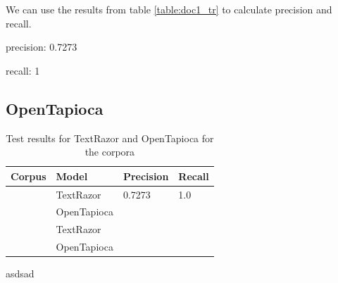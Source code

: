 \documentclass[a4paper, 11pt]{article}
\begin{document}
We can use the results from table \ref{table:doc1_tr} to calculate precision and recall.

precision: 0.7273

recall: 1


\subsection{OpenTapioca}

\begin{table}[h]
	\centering
	\begin{tabular}{llll}
	Corpus	& Model & Precision & Recall \\ \hline
	\citet{mcgee_2020}	& TextRazor & 0.7273 & 1.0  \\
	\citet{mcgee_2020}	& OpenTapioca &  &   \\
	\citet{mckeever_2020}	& TextRazor &  &   \\
	\citet{mckeever_2020}	& OpenTapioca &  &   \\
	\end{tabular}
	\caption{Test results for TextRazor and OpenTapioca for the corpora}
	\label{tab:doc1_tr}
\end{table}

asdsad



\end{document}
